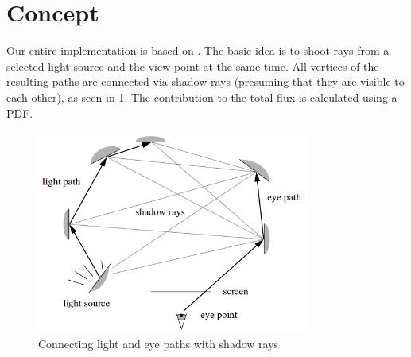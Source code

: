\section{Concept}
Our entire implementation is based on \cite{lafortune1993bi}. The basic idea is to shoot rays from a selected light source and the view point at the same time. All vertices of the resulting paths are connected via shadow rays (presuming that they are visible to each other), as seen in \ref{fig:shadow_rays}. The contribution to the total flux is calculated using a PDF.

\begin{figure}[htbp]
  \centering
     \includegraphics[width=0.8\textwidth]{pics/bi_dir_shadow_rays.png}
  \caption{Connecting light and eye paths with shadow rays \cite{lafortune1993bi}}
  \label{fig:shadow_rays}
\end{figure}